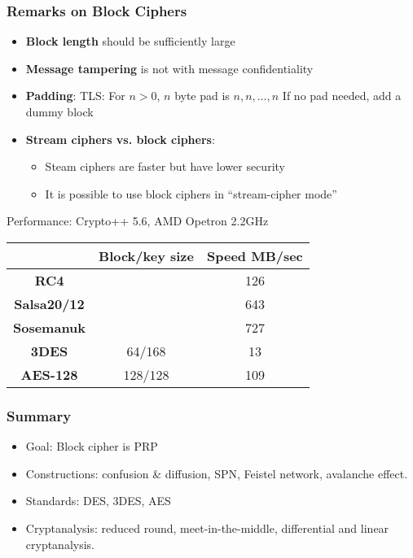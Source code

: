 \begin{frame}\frametitle{Remarks on Block Ciphers}
\begin{itemize}
\item \textbf{Block length} should be sufficiently large
\item \textbf{Message tampering} is not with message confidentiality
\item \textbf{Padding}: TLS: For $n>0$, $n$ byte pad is $n,n,\dots,n$
If no pad needed, add a dummy block
\item \textbf{Stream ciphers vs. block ciphers}: 
\begin{itemize}
\item Steam ciphers are faster but have lower security
\item It is possible to use block ciphers in ``stream-cipher mode''
\end{itemize}
\end{itemize}
\begin{exampleblock}{Performance: Crypto++ 5.6, AMD Opetron 2.2GHz}
\begin{center}
\begin{tabular}{|c|c|c|} \hline
                      & \textbf{Block/key size} & \textbf{Speed MB/sec} \\ \hline
\textbf{RC4}          &         & 126 \\  
\textbf{Salsa20/12}   &         & 643 \\ 
\textbf{Sosemanuk}    &         & 727 \\ 
\textbf{3DES}	      & 64/168  & 13  \\
\textbf{AES-128}      & 128/128 & 109 \\ \hline 
\end{tabular}	
\end{center}
\end{exampleblock}
\end{frame}
\begin{frame}\frametitle{Summary}
\begin{itemize}
\item Goal: Block cipher is PRP
\item Constructions: confusion \& diffusion, SPN, Feistel network, avalanche effect.
\item Standards: DES, 3DES, AES
\item Cryptanalysis: reduced round, meet-in-the-middle, differential and linear cryptanalysis. 
\end{itemize}
\end{frame}


